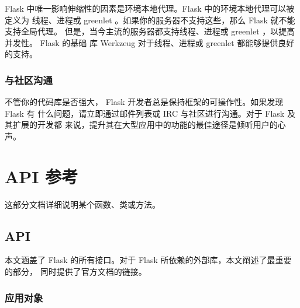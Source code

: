 \documentclass[a4paper,12pt]{sphinxmanual}
\begin{document}
Flask 中唯一影响伸缩性的因素是环境本地代理。Flask 中的环境本地代理可以被定义为
线程、进程或 greenlet 。如果你的服务器不支持这些，那么 Flask 就不能支持全局代理。
但是，当今主流的服务器都支持线程、进程或 greenlet ，以提高并发性。 Flask 的基础
库 Werkzeug 对于线程、进程或 greenlet 都能够提供良好的支持。


\section{与社区沟通}
\label{becomingbig:id9}
不管你的代码库是否强大， Flask 开发者总是保持框架的可操作性。如果发现 Flask 有
什么问题，请立即通过邮件列表或 IRC 与社区进行沟通。对于 Flask 及其扩展的开发都
来说，提升其在大型应用中的功能的最佳途径是倾听用户的心声。


\part{API 参考}
\label{latexindex:api}
这部分文档详细说明某个函数、类或方法。


\chapter{API}
\label{api:api}\label{api::doc}\label{api:id1}\label{api:module-flask}
本文涵盖了 Flask 的所有接口。对于 Flask 所依赖的外部库，本文阐述了最重要的部分，
同时提供了官方文档的链接。


\section{应用对象}
\label{api:id2}
\end{document}
